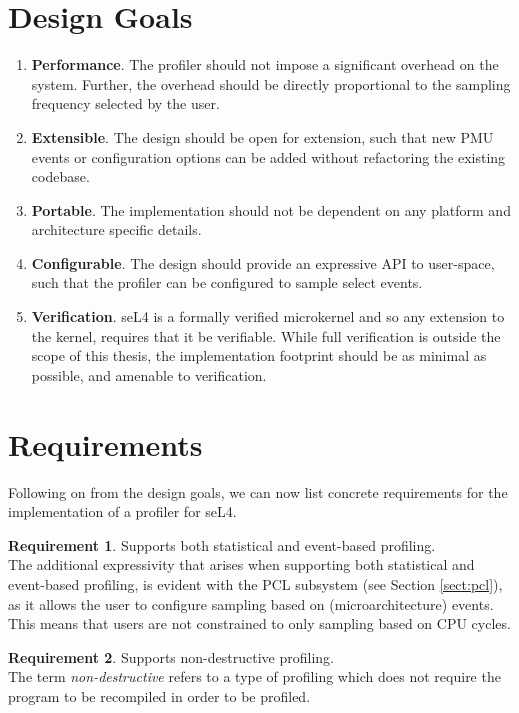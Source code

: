 \section{Design Goals}

\ssp\begin{enumerate}
    \item \textbf{Performance}. The profiler should not impose a significant overhead on the system. Further, the overhead should be directly proportional to the sampling frequency selected by the user.
    \item \textbf{Extensible}. The design should be open for extension, such that new PMU events or configuration options can be added without refactoring the existing codebase. 
    \item \textbf{Portable}. The implementation should not be dependent on any platform and architecture specific details.
    \item \textbf{Configurable}. The design should provide an expressive API to user-space, such that the profiler can be configured to sample select events. 
    \item \textbf{Verification}. seL4 is a formally verified microkernel and so any extension to the kernel, requires that it be verifiable. While full verification is outside the scope of this thesis, the implementation footprint should be as minimal as possible, and amenable to verification.
\end{enumerate}\dsp

\section{Requirements}

Following on from the design goals, we can now list concrete requirements for the implementation of a profiler for seL4.

\textbf{Requirement 1}. Supports both statistical and event-based profiling.\\
The additional expressivity that arises when supporting both statistical and event-based profiling, is evident with the PCL subsystem (see Section \ref{sect:pcl}), as it allows the user to configure sampling based on (microarchitecture) events. This means that users are not constrained to only sampling based on CPU cycles.

\textbf{Requirement 2}. Supports non-destructive profiling.\\
The term \textit{non-destructive} refers to a type of profiling which does not require the program to be recompiled in order to be profiled. 

